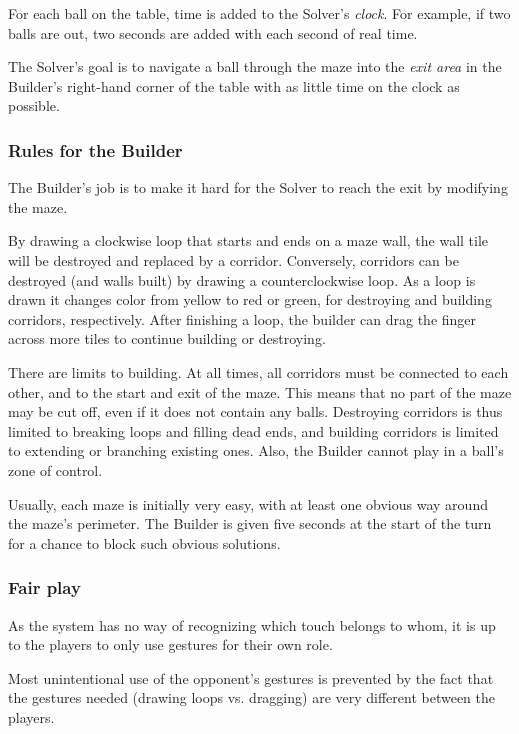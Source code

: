 \documentclass[a4paper,11pt]{article}
\begin{document}
For each ball on the table, time is added to the Solver's \emph{clock}.
For example, if two balls are out, two seconds are added with each second of
real time.

The Solver's goal is to navigate a ball through the maze into the \emph{exit
area} in the Builder's right-hand corner of the table with as little time
on the clock as possible.

\subsubsection{Rules for the Builder}

The Builder's job is to make it hard for the Solver to reach the exit by
modifying the maze.

By drawing a clockwise loop that starts and ends on a maze wall, the wall
tile will be destroyed and replaced by a corridor.
Conversely, corridors can be destroyed (and walls built) by drawing a
counterclockwise loop.
As a loop is drawn it changes color from yellow to red or green, for destroying
and building corridors, respectively.
After finishing a loop, the builder can drag the finger across more tiles
to continue building or destroying.

There are limits to building.
At all times, all corridors must be connected to each other, and to the start
and exit of the maze.
This means that no part of the maze may be cut off, even if it does not contain
any balls.
Destroying corridors is thus limited to breaking loops and filling dead ends,
and building corridors is limited to extending or branching existing ones.
Also, the Builder cannot play in a ball's zone of control.

Usually, each maze is initially very easy, with at least one obvious way
around the maze's perimeter.
The Builder is given five seconds at the start of the turn for a chance to
block such obvious solutions.

\subsubsection{Fair play}

As the system has no way of recognizing which touch belongs to whom,
it is up to the players to only use gestures for their own role.

Most unintentional use of the opponent's gestures is prevented by the fact that
the gestures needed (drawing loops vs. dragging) are very different between the
players.
\end{document}
